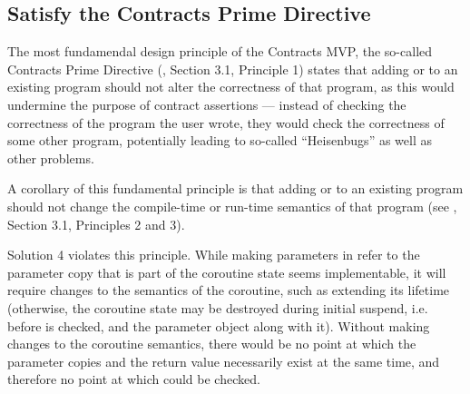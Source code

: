 

\subsection{Satisfy the Contracts Prime Directive}
\label{goal_prime_directive}

The most fundamendal design principle of the Contracts MVP, the so-called Contracts Prime Directive (\cite{P2900R8}, Section 3.1, Principle 1) states that adding  or  to an existing program should not alter the correctness of that program, as this would undermine the purpose of contract assertions --- instead of checking the correctness of the program the user wrote, they would check the correctness of some other program, potentially leading to so-called ``Heisenbugs'' as well as other problems.

A corollary of this fundamental principle is that adding  or  to an existing program should not change the compile-time or run-time semantics of that program (see \cite{P2900R8}, Section 3.1, Principles 2 and 3).

Solution 4 violates this principle. While making parameters in  refer to the parameter copy that is part of the coroutine state seems implementable, it will require changes to the semantics of the coroutine, such as extending its lifetime (otherwise, the coroutine state may be destroyed during initial suspend, i.e. before  is checked, and the parameter object along with it). Without making changes to the coroutine semantics, there would be no point at which the parameter copies and the return value necessarily exist at the same time, and therefore no point at which  could be checked.

